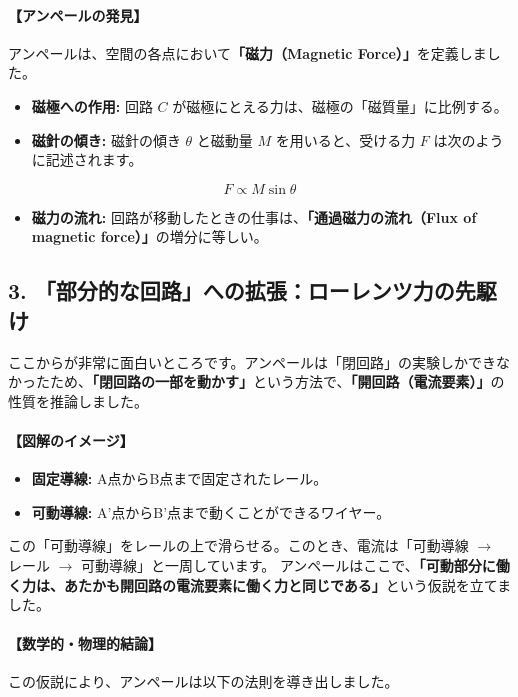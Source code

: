 \documentclass[a4paper,11pt,openany]{ltjsbook}
\begin{document}
\begin{lecturebox}
\paragraph{【アンペールの発見】}
アンペールは、空間の各点において\textbf{「磁力（Magnetic Force）」}を定義しました。
\begin{itemize}[leftmargin=2em]
\item \textbf{磁極への作用:} 回路 $C$ が磁極にとえる力は、磁極の「磁質量」に比例する。
\item \textbf{磁針の傾き:} 磁針の傾き $\theta$ と磁動量 $M$ を用いると、受ける力 $F$ は次のように記述されます。
\end{itemize}
    $$F \propto M \sin \theta$$
\begin{itemize}[leftmargin=2em]
\item \textbf{磁力の流れ:} 回路が移動したときの仕事は、\textbf{「通過磁力の流れ（Flux of magnetic force）」}の増分に等しい。
\end{itemize}

\subsection*{3. 「部分的な回路」への拡張：ローレンツ力の先駆け}

ここからが非常に面白いところです。アンペールは「閉回路」の実験しかできなかったため、\textbf{「閉回路の一部を動かす」}という方法で、\textbf{「開回路（電流要素）」}の性質を推論しました。

\paragraph{【図解のイメージ】}
\begin{itemize}[leftmargin=2em]
\item \textbf{固定導線:} A点からB点まで固定されたレール。
\item \textbf{可動導線:} A'点からB'点まで動くことができるワイヤー。
\end{itemize}

この「可動導線」をレールの上で滑らせる。このとき、電流は「可動導線 $\rightarrow$ レール $\rightarrow$ 可動導線」と一周しています。
アンペールはここで、\textbf{「可動部分に働く力は、あたかも開回路の電流要素に働く力と同じである」}という仮説を立てました。

\paragraph{【数学的・物理的結論】}
この仮説により、アンペールは以下の法則を導き出しました。


\end{lecturebox}
\end{document}
